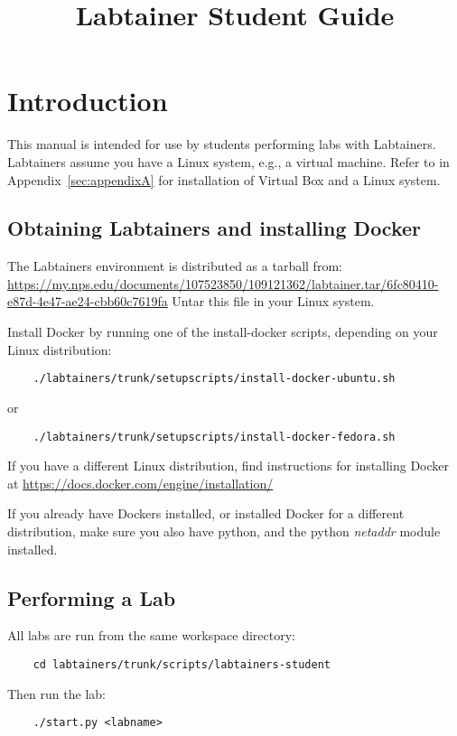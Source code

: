 \documentclass{article}
\begin{document}
\title {Labtainer Student Guide}
\maketitle

\section {Introduction}
This manual is intended for use by students performing labs with Labtainers.
Labtainers assume you have a Linux system, e.g., a virtual machine.  Refer to
in Appendix~\ref{sec:appendixA} for installation of Virtual Box and a Linux system.

\subsection{Obtaining Labtainers and installing Docker}
The Labtainers environment is distributed as a tarball from:
\url{https://my.nps.edu/documents/107523850/109121362/labtainer.tar/6fc80410-e87d-4e47-ae24-cbb60c7619fa}
Untar this file in your Linux system.

Install Docker by running one of the install-docker scripts, depending on your Linux
distribution:
\begin{verbatim}
    ./labtainers/trunk/setupscripts/install-docker-ubuntu.sh
\end{verbatim}
\noindent or 
\begin{verbatim}
    ./labtainers/trunk/setupscripts/install-docker-fedora.sh
\end{verbatim}
If you have a different Linux distribution, find instructions for installing Docker at
\url{https://docs.docker.com/engine/installation/}

If you already have Dockers installed, or installed Docker for a different distribution,
make sure you also have python, and
the python \textit{netaddr} module installed.

\subsection{Performing a Lab}
All labs are run from the same workspace directory:
\begin{verbatim}
    cd labtainers/trunk/scripts/labtainers-student
\end{verbatim}
\noindent Then run the lab:
\begin{verbatim}
    ./start.py <labname>
\end{verbatim}
\end{document}
